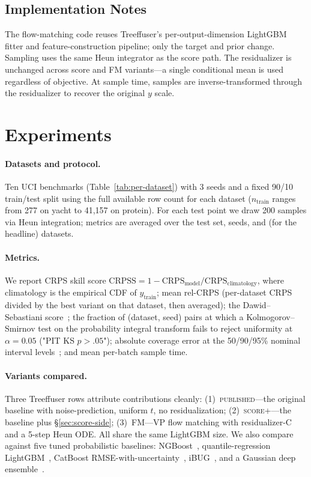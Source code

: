 \documentclass{uai2026}
\newcommand{\crps}{\mathrm{CRPS}}
\newcommand{\crpss}{\mathrm{CRPSS}}
\begin{document}
\subsection{Implementation Notes}\label{sec:impl}
The flow-matching code reuses Treeffuser's per-output-dimension LightGBM fitter and feature-construction pipeline; only the target and prior change. Sampling uses the same Heun integrator as the score path. The residualizer is unchanged across score and FM variants---a single conditional mean is used regardless of objective. At sample time, samples are inverse-transformed through the residualizer to recover the original $y$ scale.

\section{Experiments}\label{sec:exp}

\paragraph{Datasets and protocol.} Ten UCI benchmarks (Table~\ref{tab:per-dataset}) with 3 seeds and a fixed 90/10 train/test split using the full available row count for each dataset ($n_{\text{train}}$ ranges from 277 on yacht to 41{,}157 on protein). For each test point we draw 200 samples via Heun integration; metrics are averaged over the test set, seeds, and (for the headline) datasets.

\paragraph{Metrics.} We report CRPS skill score $\crpss = 1 - \crps_{\text{model}} / \crps_{\text{climatology}}$, where climatology is the empirical CDF of $y_{\text{train}}$; mean rel-CRPS (per-dataset CRPS divided by the best variant on that dataset, then averaged); the Dawid--Sebastiani score~\citep{dawid1984pit}; the fraction of (dataset, seed) pairs at which a Kolmogorov--Smirnov test on the probability integral transform fails to reject uniformity at $\alpha=0.05$ ("PIT KS $p{>}.05$"); absolute coverage error at the 50/90/95\% nominal interval levels~\citep{gneiting2007crps}; and mean per-batch sample time.

\paragraph{Variants compared.} Three Treeffuser rows attribute contributions cleanly: (1)~\textsc{published}---the original baseline with noise-prediction, uniform $t$, no residualization; (2)~\textsc{score+}---the baseline plus \S\ref{sec:score-side}; (3)~\textsc{FM}---VP flow matching with residualizer-C and a 5-step Heun ODE. All share the same LightGBM size. We also compare against five tuned probabilistic baselines: NGBoost~\citep{duan2020ngboost}, quantile-regression LightGBM~\citep{ke2017lightgbm}, CatBoost RMSE-with-uncertainty~\citep{prokhorenkova2018catboost}, iBUG~\citep{brophy2022ibug}, and a Gaussian deep ensemble~\citep{lakshminarayanan2017deep}.
\end{document}
